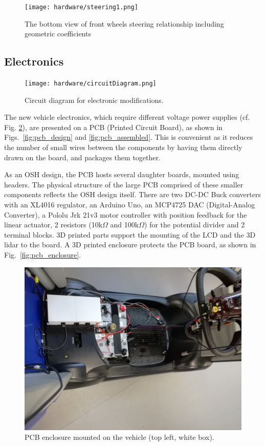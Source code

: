 \documentclass[a4paper]{article}
\begin{document}
	
	\begin{figure}[h]
		\texttt{[image: hardware/steering1.png]}
		\caption{The bottom view of front wheels steering relationship including geometric coefficients}
		\label{fig:steering}
	\end{figure}
	
	
	\subsection{Electronics}
	
	\begin{figure}[h]
		\texttt{[image: hardware/circuitDiagram.png]}
		\caption{Circuit diagram for electronic modifications.}
		\label{fig:circuitDiagram}
	\end{figure}
	
	
	The new vehicle electronics, which require different voltage power supplies (cf. Fig. \ref{fig:circuitDiagram}), are presented on a PCB (Printed Circuit Board), as shown in Figs.~\ref{fig:pcb_design} and \ref{fig:pcb_assembled}. This is convenient as it reduces the number of small wires between the components by having them directly drawn on the board, and packages them together.
	
	As an OSH design, the PCB hosts several daughter boards, mounted using headers. The physical structure of the large PCB comprised of these smaller components reflects the OSH design itself. There are two DC-DC Buck converters with an XL4016 regulator, an Arduino Uno, an MCP4725 DAC (Digital-Analog Converter), a Pololu Jrk 21v3 motor controller with position feedback for the linear actuator, 2 resistors (10k$\Omega$ and 100k$\Omega$) for the potential divider and 2 terminal blocks. 3D printed parts support the mounting of the LCD and the 3D lidar to the board. A 3D printed enclosure protects the PCB board, as shown in Fig.~\ref{fig:pcb_enclosure}.
	
	\begin{figure}
		\centering
		\includegraphics[width=0.6\linewidth]{hardware/pcb_enclosure.jpg}
		\caption{PCB enclosure mounted on the vehicle (top left, white box).}
		\label{fig:pcb_enclisure}
	\end{figure}
	
\end{document}
